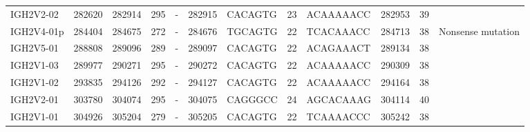 \begin{tabular}{lrrrlrlrlrrl}
  IGH2V2-02 & 282620 & 282914 & 295 & - & 282915 & CACAGTG & 23 & ACAAAAACC & 282953 & 39 &  \\ 
  IGH2V4-01p & 284404 & 284675 & 272 & - & 284676 & TGCAGTG & 22 & TCACAAACC & 284713 & 38 & Nonsense mutation \\ 
  IGH2V5-01 & 288808 & 289096 & 289 & - & 289097 & CACAGTG & 22 & ACAGAAACT & 289134 & 38 &  \\ 
  IGH2V1-03 & 289977 & 290271 & 295 & - & 290272 & CACAGTG & 22 & ACAAAAACC & 290309 & 38 &  \\ 
  IGH2V1-02 & 293835 & 294126 & 292 & - & 294127 & CACAGTG & 22 & ACAAAAACC & 294164 & 38 &  \\ 
  IGH2V2-01 & 303780 & 304074 & 295 & - & 304075 & CAGGGCC & 24 & AGCACAAAG & 304114 & 40 &  \\ 
  IGH2V1-01 & 304926 & 305204 & 279 & - & 305205 & CACAGTG & 22 & TCAAAACCC & 305242 & 38 &  \\ 
   \bottomrule \end{tabular}
